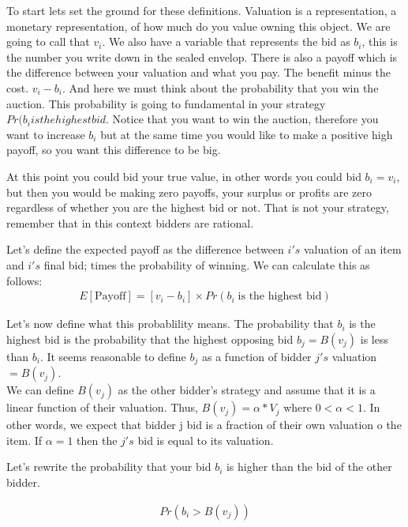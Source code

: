 \documentclass[11pt]{article} %
\begin{document}
To start lets set the ground for these definitions. Valuation is a representation, a monetary representation, of how much do you value owning this object. We are going to call that $v_i$. We also have a variable that represents the bid as $b_i$, this is the number you write down in the sealed envelop. There is also a payoff which is the difference between your valuation and what you pay. The benefit minus the cost. $v_i - b_i$. And here we must think about the probability that you win the auction.  This probability is going to fundamental in your strategy $Pr(b_i is the highest bid$. Notice that you want to win the auction, therefore you want to increase $b_i$ but at the same time you would like to make a positive high payoff, so you want this difference to be big.

At this point you could bid your true value, in other words you could bid $b_i=v_i$, but then you would be making zero payoffs, your surplus or profits are zero regardless of whether you are the highest bid or not. That is not your strategy, remember that in this context bidders are rational.
        
Let's define the expected payoff as the difference between $i's$ valuation of an item and $i's$ final bid; times the probability of winning. We can calculate this as follows:\\
        \begin{align*}
            E[\text{Payoff}] = [v_i - b_i] \times Pr(b_i \; \text{is the highest bid})
        \end{align*}
 
 Let's now define what this probablility means.  The probability that $b_i$ is the highest bid is the probability that the highest opposing bid $b_j=B(v_j)$ is less than $b_i$.
 It seems reasonable to  define $b_j$ as a function of bidder $j's$  valuation $=B(v_j)$.\\

 We can define $B(v_j)$ as the other bidder's strategy and assume that it is a linear function of their valuation. Thus, $B(v_j) = \alpha*V_j$ where $0<\alpha<1$. In other words, we expect that bidder j bid is a fraction of their own valuation o the item. If $\alpha=1$ then the $j's$ bid is equal to its valuation. 
        
Let's rewrite the probability that your bid $b_i$ is higher than the bid of the other bidder.

        \begin{align*}
            Pr(b_i > B(v_j))
        \end{align*}
        
\end{document}
